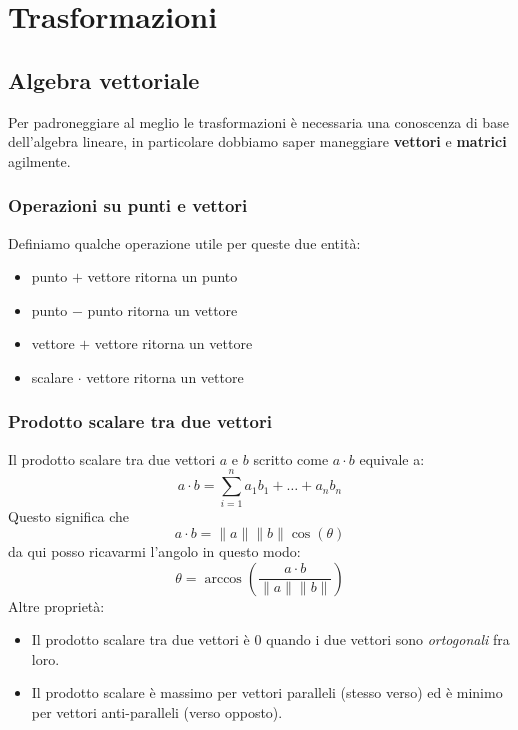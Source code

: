 \chapter{Trasformazioni}
\section{Algebra vettoriale}
Per padroneggiare al meglio le trasformazioni \`e necessaria una conoscenza di base
dell'algebra lineare, in particolare dobbiamo saper maneggiare \textbf{vettori} e
\textbf{matrici} agilmente.

\subsection{Operazioni su punti e vettori}
Definiamo qualche operazione utile per queste due entit\`a:
\begin{itemize}
	\item punto $+$ vettore ritorna un punto
	\item punto $-$ punto ritorna un vettore
	\item vettore $+$ vettore ritorna un vettore
	\item scalare $\cdot$ vettore ritorna un vettore
\end{itemize}

\subsection{Prodotto scalare tra due vettori}
Il prodotto scalare tra due vettori $a$ e $b$ scritto come $a \cdot b$ equivale a:
\[ a \cdot b = \sum_{i=1}^n a_1 b_1 + \dots + a_n b_n  \]
Questo significa che
\[ a \cdot b = \| a \| \| b \| \cos{(\theta)} \]
da qui posso ricavarmi l'angolo in questo modo:
\[ \theta = \arccos{\left( \frac{a \cdot b}{\| a \| \| b \|} \right)} \]
Altre propriet\`a:
\begin{itemize}
	\item Il prodotto scalare tra due vettori \`e 0 quando i due vettori sono \emph{ortogonali}
	      fra loro.
	\item Il prodotto scalare \`e massimo per vettori paralleli (stesso verso) ed \`e minimo
	      per vettori anti-paralleli (verso opposto).
\end{itemize}

